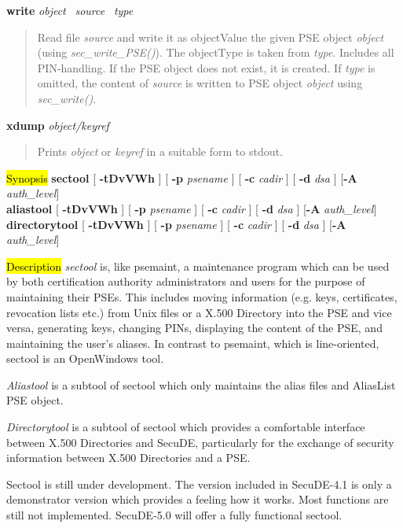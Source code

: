 {\bf write} {\em object}~ {\em source}~ {\em type}
\begin{quote}
Read file {\em source} and write it as objectValue the given PSE object {\em object} (using
{\em sec\_write\_PSE()}). The objectType is taken from {\em type}.
Includes all PIN-handling. If the PSE object does not exist, it is created.
If {\em type} is omitted, the content of {\em source} is written to PSE object
{\em object} using {\em sec\_write()}.
\end{quote}

{\bf xdump} {\em object/keyref} 
\begin{quote}
Prints {\em object} or {\em keyref} in a suitable form to stdout.
\end{quote}

\label{sectool}
\hl{Synopsis}
{\bf sectool} [ {\bf -tDvVWh} ] [ {\bf -p} {\em psename} ] [ {\bf -c} {\em cadir} ] [ {\bf -d} {\em dsa} ] [{\bf -A} {\em auth\_level}] \\
{\bf aliastool} [ {\bf -tDvVWh} ] [ {\bf -p} {\em psename} ] [ {\bf -c} {\em cadir} ] [ {\bf -d} {\em dsa} ] [{\bf -A} {\em auth\_level}] \\
{\bf directorytool} [ {\bf -tDvVWh} ] [ {\bf -p} {\em psename} ] [ {\bf -c} {\em cadir} ] [ {\bf -d} {\em dsa} ] [{\bf -A} {\em auth\_level}]

\hl{Description}
{\em sectool} is, like psemaint,  a maintenance program which can be used by both
certification authority administrators and users for the purpose
of maintaining their PSEs. This includes moving information (e.g. keys,
certificates, revocation lists etc.) from Unix files or a X.500 Directory
into the PSE and vice versa, generating keys, changing PINs, displaying
the content of the PSE, and maintaining the user's aliases. In contrast
to psemaint, which is line-oriented, sectool is an OpenWindows tool.

{\em Aliastool} is a subtool of sectool which only maintains the alias
files and AliasList PSE object.

{\em Directorytool} is a subtool of sectool which provides a comfortable
interface between X.500 Directories and SecuDE, particularly for the
exchange of security information between X.500 Directories and a PSE.

Sectool is still under development. The version included in SecuDE-4.1
is only a demonstrator version which provides a feeling how it works.
Most functions are still not implemented. SecuDE-5.0 will offer a fully
functional sectool.

